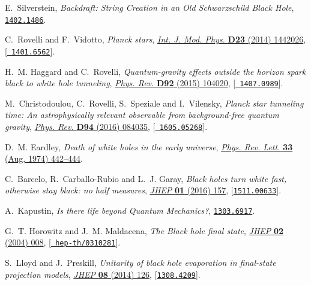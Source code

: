 \documentclass[12pt]{article}
\begin{document}
\begin{thebibliography}{100}
E.~Silverstein, \emph{{Backdraft: String Creation in an Old Schwarzschild Black
  Hole}},  \href{http://arxiv.org/abs/1402.1486}{{\tt 1402.1486}}.

C.~Rovelli and F.~Vidotto, \emph{{Planck stars}},
  \href{http://dx.doi.org/10.1142/S0218271814420267}{\emph{Int. J. Mod. Phys.}
  {\bf D23} (2014) 1442026}, [\href{http://arxiv.org/abs/1401.6562}{{\tt
  1401.6562}}].

H.~M. Haggard and C.~Rovelli, \emph{{Quantum-gravity effects outside the
  horizon spark black to white hole tunneling}},
  \href{http://dx.doi.org/10.1103/PhysRevD.92.104020}{\emph{Phys. Rev.} {\bf
  D92} (2015) 104020}, [\href{http://arxiv.org/abs/1407.0989}{{\tt
  1407.0989}}].

M.~Christodoulou, C.~Rovelli, S.~Speziale and I.~Vilensky, \emph{{Planck star
  tunneling time: An astrophysically relevant observable from background-free
  quantum gravity}},
  \href{http://dx.doi.org/10.1103/PhysRevD.94.084035}{\emph{Phys. Rev.} {\bf
  D94} (2016) 084035}, [\href{http://arxiv.org/abs/1605.05268}{{\tt
  1605.05268}}].

D.~M. Eardley, \emph{Death of white holes in the early universe},
  \href{http://dx.doi.org/10.1103/PhysRevLett.33.442}{\emph{Phys. Rev. Lett.}
  {\bf 33} (Aug, 1974) 442--444}.

C.~Barcelo, R.~Carballo-Rubio and L.~J. Garay, \emph{{Black holes turn white
  fast, otherwise stay black: no half measures}},
  \href{http://dx.doi.org/10.1007/JHEP01(2016)157}{\emph{JHEP} {\bf 01} (2016)
  157}, [\href{http://arxiv.org/abs/1511.00633}{{\tt 1511.00633}}].

A.~Kapustin, \emph{{Is there life beyond Quantum Mechanics?}},
  \href{http://arxiv.org/abs/1303.6917}{{\tt 1303.6917}}.

G.~T. Horowitz and J.~M. Maldacena, \emph{{The Black hole final state}},
  \href{http://dx.doi.org/10.1088/1126-6708/2004/02/008}{\emph{JHEP} {\bf 02}
  (2004) 008}, [\href{http://arxiv.org/abs/hep-th/0310281}{{\tt
  hep-th/0310281}}].

S.~Lloyd and J.~Preskill, \emph{{Unitarity of black hole evaporation in
  final-state projection models}},
  \href{http://dx.doi.org/10.1007/JHEP08(2014)126}{\emph{JHEP} {\bf 08} (2014)
  126}, [\href{http://arxiv.org/abs/1308.4209}{{\tt 1308.4209}}].


\end{thebibliography}
\end{document}

